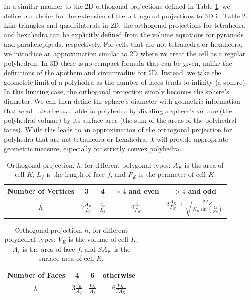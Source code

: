  In a similar manner to the 2D orthogonal projections defined in Table \ref{tab::orth_proj_2D}, we define our choice for the extension of the orthogonal projections to 3D in Table \ref{tab::orth_proj_3D}. Like triangles and quadrilaterals in 2D, the orthogonal projections for tetrahedra and hexahedra can be explicitly defined from the volume equations for pyramids and parallelepipeds, respectively. For cells that are not tetrahedra or hexahedra, we introduce an approximation similar to 2D where we treat the cell as a regular polyhedron. In 3D there is no compact formula that can be given, unlike the definitions of the apothem and circumradius for 2D. Instead, we take the geometric limit of a polyhedra as the number of faces tends to infinity (a sphere). In this limiting case, the orthogonal projection simply becomes the sphere's diameter. We can then define the sphere's diameter with geometric information that would also be available to polyhedra by dividing a sphere's volume (the polyhedral volume) by its surface area (the sum of the areas of the polyhedral faces). While this leads to an approximation of the orthogonal projection for polyhedra that are not tetrahedra or hexahedra, it will provide appropriate geometric measure, especially for strictly convex polyhedra.

\begin{table}[h]
\centering
\caption{Orthogonal projection, $h$, for different polygonal types: $A_K$ is the area of cell $K$, $L_f$ is the length of face $f$, and $P_K$ is the perimeter of cell $K$.}
\def\arraystretch{1.4}
\begin{tabular}{|c|c|c|c|c|}
	\hline
	Number of Vertices & 3 & 4 & $>4$ and even& $>4$ and odd \\
	\hline
	$h$ & $2 \frac{A_K}{L_f}$ & $\frac{A_K}{L_f}$ & $4 \frac{A_K}{P_K}$ & $2 \frac{A_K}{P_K} + \sqrt{\frac{2 A_K}{N_K \sin(\frac{2 \pi}{N_K})}}$ \\
	\hline
\end{tabular}
\label{tab::orth_proj_2D}
\end{table}

\begin{table}[h]
\centering
\caption{Orthogonal projection, $h$, for different polyhedral types: $V_K$ is the volume of cell $K$, $A_f$ is the area of face $f$, and $SA_K$ is the surface area of cell $K$.}
\def\arraystretch{1.4}
\begin{tabular}{|c|c|c|c|}
	\hline
	Number of Faces & 4 & 6 & otherwise \\
	\hline
	$h$ & $3 \frac{V_K}{A_f}$ & $\frac{V_K}{A_f}$ & $6 \frac{V_K}{SA_K}$  \\ [1ex]
	\hline
\end{tabular}
\label{tab::orth_proj_3D}
\end{table}

